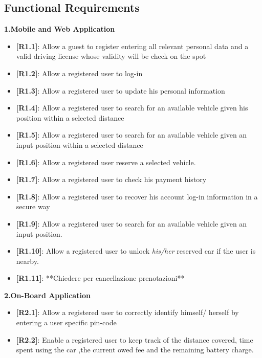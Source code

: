 \documentclass[12pt]{article}
\begin{document}
	  \subsection{Functional Requirements}
	  \textbf{1.Mobile and Web Application}
	  \begin{itemize}
	 		\item{\textbf{[R1.1]}}: Allow a guest to register entering all relevant personal 
	 			 data and a valid driving license whose validity will be check on the spot
	 		\item{\textbf{[R1.2]}}: Allow a registered user to log-in
	 		\item{\textbf{[R1.3]}}: Allow a registered user to update his personal information
	 		\item{\textbf{[R1.4]}}: Allow a registered user to search for an available vehicle 
	 			 given his position within a selected distance
	 		\item{\textbf{[R1.5]}}: Allow a registered user to search for an available vehicle 	
	 			 given an input position within a selected distance
	  		\item{\textbf{[R1.6]}}: Allow a registered user reserve a selected vehicle.
	 		\item{\textbf{[R1.7]}}: Allow a registered user to check his payment history
	 		\item{\textbf{[R1.8]}}: Allow a registered user to recover his account log-in 	
	 			 information in a secure way
	 		\item{\textbf{[R1.9]}}: Allow a registered user to search for an available vehicle 	
	 			 given an input position.
	 		\item{\textbf{[R1.10]}}: Allow a registered user to unlock \emph{his/her} reserved 	
	 			 car if the user is nearby.
	 		\item{\textbf{[R1.11]}}: **Chiedere per cancellazione prenotazioni**
	 	\end{itemize}

		\textbf{2.On-Board Application}
		\begin{itemize}
	 		\item{\textbf{[R2.1]}}: Allow a registered user to correctly identify himself/
	 			 herself 	by entering a user specific pin-code
 	 		\item{\textbf{[R2.2]}}: Enable a registered user to keep track of the distance 
 	 			 covered, time spent using the car ,the current owed fee and the remaining 	
 	 			 battery charge.
 	 	\end{itemize}
 	 
\end{document}
